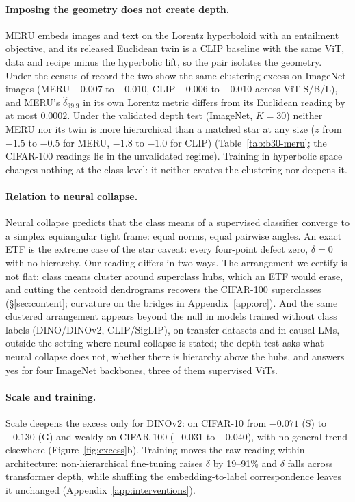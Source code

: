 \documentclass{article}
\begin{document}
\paragraph{Imposing the geometry does not create depth.} MERU \citep{desai2023meru} embeds images and text on the Lorentz hyperboloid with an entailment objective, and its released Euclidean twin is a CLIP baseline with the same ViT, data and recipe minus the hyperbolic lift, so the pair isolates the geometry. Under the census of record the two show the same clustering excess on ImageNet images (MERU $-0.007$ to $-0.010$, CLIP $-0.006$ to $-0.010$ across ViT-S/B/L), and MERU's $\hat\delta_{99.9}$ in its own Lorentz metric differs from its Euclidean reading by at most $0.0002$. Under the validated depth test (ImageNet, $K{=}30$) neither MERU nor its twin is more hierarchical than a matched star at any size ($z$ from $-1.5$ to $-0.5$ for MERU, $-1.8$ to $-1.0$ for CLIP) (Table~\ref{tab:b30-meru}; the CIFAR-100 readings lie in the unvalidated regime). Training in hyperbolic space changes nothing at the class level: it neither creates the clustering nor deepens it. %

\paragraph{Relation to neural collapse.} Neural collapse \citep{papyan2020prevalence} predicts that the class means of a supervised classifier converge to a simplex equiangular tight frame: equal norms, equal pairwise angles. An exact ETF is the extreme case of the star caveat: every four-point defect zero, $\delta=0$ with no hierarchy. Our reading differs in two ways. The arrangement we certify is not flat: class means cluster around superclass hubs, which an ETF would erase, and cutting the centroid dendrograms recovers the CIFAR-100 superclasses (\S\ref{sec:content}; curvature on the bridges in Appendix~\ref{app:orc}). And the same clustered arrangement appears beyond the null in models trained without class labels (DINO/DINOv2, CLIP/SigLIP), on transfer datasets and in causal LMs, outside the setting where neural collapse is stated; the depth test asks what neural collapse does not, whether there is hierarchy above the hubs, and answers yes for four ImageNet backbones, three of them supervised ViTs. %

\paragraph{Scale and training.} Scale deepens the excess only for DINOv2: on CIFAR-10 from $-0.071$ (S) to $-0.130$ (G) and weakly on CIFAR-100 ($-0.031$ to $-0.040$), with no general trend elsewhere (Figure~\ref{fig:excess}b). Training moves the raw reading within architecture: non-hierarchical fine-tuning raises $\delta$ by 19--91\% and $\delta$ falls across transformer depth, while shuffling the embedding-to-label correspondence leaves it unchanged (Appendix~\ref{app:interventions}). %
\end{document}
